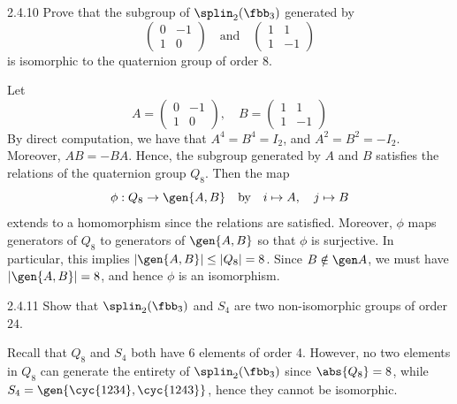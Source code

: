 \begin{exercise}{2.4.10}
    Prove that the subgroup of $\splin_2(\fbb_3)$ generated by
    \[
        \begin{pmatrix}
            0 & -1 \\ 
            1 & 0 
        \end{pmatrix} \quad \text{and} \quad
        \begin{pmatrix}
            1 & 1 \\ 
            1 & -1 
        \end{pmatrix}
    \]
    is isomorphic to the quaternion group of order $8$.
    
\end{exercise}

\begin{sol}
    Let
    \[
    	A = 
        \begin{pmatrix}
            0 & -1 \\
            1 & 0
        \end{pmatrix}, \quad B = 
        \begin{pmatrix}
            1 & 1 \\
            1 & -1
        \end{pmatrix}
	\]
    By direct computation, we have that $A^4 = B^4 = I_2$, and $A^2 = B^2 = -I_2$.
	Moreover, $AB = -BA$.
	Hence, the subgroup generated by $A$ and $B$ satisfies the relations of the quaternion group $Q_8$.
	Then the map
    \[
    	\phi : Q_8 \to \gen{A, B} \quad \text{by} \quad i \mapsto A, \quad j \mapsto B
    \]
    extends to a homomorphism since the relations are satisfied.
	Moreover, $\phi$ maps generators of $Q_8$ to generators of $\gen{A, B}$ so that $\phi$ is surjective.
	In particular, this implies $|\gen{A, B}| \leq |Q_8| = 8$.
	Since $B \notin \gen A$, we must have $|\gen{A, B}| = 8$, and hence $\phi$ is an isomorphism.
\end{sol}

\begin{exercise}{2.4.11}
    Show that $\splin_2(\fbb_3)$ and $S_4$ are two non-isomorphic groups of order $24$.
\end{exercise}

\begin{sol}
    Recall that $Q_8$ and $S_4$ both have 6 elements of order 4.
	However, no two elements in $Q_8$ can generate the entirety of $\splin_2(\fbb_3)$ since $\abs{Q_8} = 8$, while $S_4 = \gen{\cyc{1 2 3 4}, \cyc{1 2 4 3}}$, hence they cannot be isomorphic.
\end{sol}


